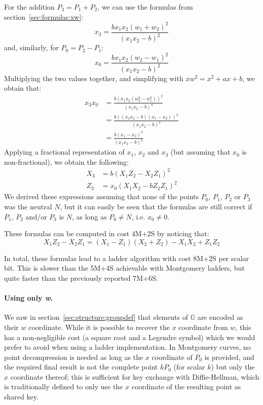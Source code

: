 \documentclass{llncs}
\newcommand{\bG}{\mathbb{G}}
\begin{document}
For the addition $P_3 = P_1 + P_2$, we can use the formulas from
section~\ref{sec:formulas:xw}:
\begin{equation*}
    x_3 = \frac{b x_1 x_2 (w_1 + w_2)^2}{(x_1 x_2 - b)^2}
\end{equation*}
and, similarly, for $P_0 = P_2 - P_1$:
\begin{equation*}
    x_0 = \frac{b x_1 x_2 (w_2 - w_1)^2}{(x_1 x_2 - b)^2}
\end{equation*}
Multiplying the two values together, and simplifying with
$xw^2 = x^2 + ax + b$, we obtain that:
\begin{align*}
    x_3 x_0 &= \frac{b (x_1 x_2 (w_2^2 - w_1^2))^2}{(x_1 x_2 - b)^4} \\
            &= \frac{b ((x_1 x_2 - b)(x_1 - x_2))^2}{(x_1 x_2 - b)^4} \\
            &= \frac{b (x_1 - x_2)^2}{(x_1 x_2 - b)^2}
\end{align*}
Applying a fractional representation of $x_1$, $x_2$ and $x_3$ (but assuming
that $x_0$ is non-fractional), we obtain the following:
\begin{align*}
    X_3 &= b (X_1 Z_2 - X_2 Z_1)^2 \\
    Z_3 &= x_0 (X_1 X_2 - b Z_2 Z_1)^2
\end{align*}
We derived these expressions assuming that none of the points $P_0$,
$P_1$, $P_2$ or $P_3$ was the neutral $N$, but it can easily be seen
that the formulas are still correct if $P_1$, $P_2$ and/or $P_3$ is $N$,
as long as $P_0 \neq N$, i.e. $x_0 \neq 0$.

These formulas can be computed in cost 4M+2S by noticing that:
\begin{equation*}
    X_1 Z_2 - X_2 Z_1 = (X_1 - Z_1)(X_2 + Z_2) - X_1 X_2 + Z_1 Z_2
\end{equation*}

In total, these formulas lead to a ladder algorithm with cost 8M+2S per
scalar bit. This is slower than the 5M+4S achievable with Montgomery
ladders, but quite faster than the previously reported 7M+6S.

\paragraph{Using only \emph{w}.} We saw in
section~\ref{sec:structure:groupdef} that elements of $\bG$ are encoded
as their $w$ coordinate. While it is possible to recover the $x$
coordinate from $w$, this has a non-negligible cost (a square root and a
Legendre symbol) which we would prefer to avoid when using a ladder
implementation. In Montgomery curves, no point decompression is needed
as long as the $x$ coordinate of $P_0$ is provided, and the required
final result is not the complete point $kP_0$ (for scalar $k$) but only
the $x$ coordinate thereof; this is sufficient for key exchange with
Diffie-Hellman, which is traditionally defined to only use the $x$
coordinate of the resulting point as shared key.
\end{document}
